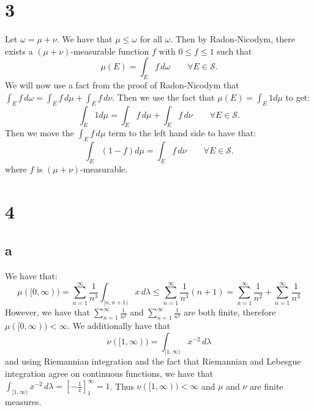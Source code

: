 \documentclass{article}
\theoremstyle{definition}
\numberwithin{theorem}{section}
\numberwithin{equation}{section}
\begin{document}
\section{3}
Let $\omega = \mu + \nu$. We have that $\mu \leq \omega$ for all $\omega$. Then by Radon-Nicodym, there exists a $(\mu + \nu)$-measurable function $f$ with $0 \leq f \leq 1$ such that
\begin{equation}
	\mu(E) = \int_E f \, d\omega \qquad \forall E \in \mathcal{S}.
\end{equation} 
We will now use a fact from the proof of Radon-Nicodym that $\int_E f \, d\omega = \int_E f \, d\mu +  \int_E f \, d\nu$. Then we use the fact that $\mu(E) = \int_E 1 d\mu$ to get:
\begin{equation}
	\int_E 1 d\mu = \int_E f \, d\mu +  \int_E f \, d\nu \qquad \forall E \in \mathcal{S}.
\end{equation}
Then we move the $\int_E f \, d\mu$ term to the left hand side to have that:
\begin{equation}
	\int_E \left(1 - f\right) d\mu = \int_E f \, d\nu \qquad \forall E \in \mathcal{S}.
\end{equation}
where $f$ is $(\mu + \nu)$-measurable. 
\section{4}

\subsection{a}
We have that:
\begin{equation}
	\mu([0, \infty)) = \sum_{n = 1}^{\infty} \frac{1}{n^3} \int_{[n, n + 1)} x \, d\lambda \leq \sum_{n = 1}^{\infty} \frac{1}{n^3} (n + 1) = \sum_{n = 1}^{\infty} \frac{1}{n^2} + \sum_{n = 1}^{\infty} \frac{1}{n^3}
\end{equation}
However, we have that $\sum_{n = 1}^{\infty} \frac{1}{n^2}$ and $\sum_{n = 1}^{\infty} \frac{1}{n^3}$ are both finite, therefore $\mu([0, \infty)) < \infty$. 
We additionally have that
\begin{equation}
	\nu([1, \infty)) = \int_{[1, \infty)} x^{-2} \, d\lambda
\end{equation}
and using Riemannian integration and the fact that Riemannian and Lebesgue integration agree on continuous functions, we have that $\int_{[1, \infty)} x^{-2} \, d\lambda = \left[ -\frac{1}{x} \right]^\infty_{1} = 1$. Thus $\nu([1, \infty)) < \infty$ and $\mu$ and $\nu$ are finite measures. 
\end{document}
